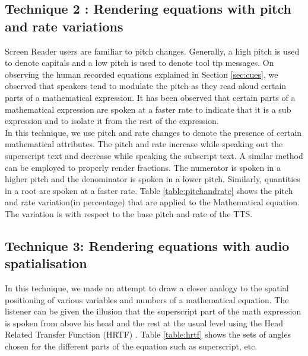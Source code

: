 \documentclass{article}
\begin{document}


\subsection{Technique 2 : Rendering equations with pitch and rate variations}
\label{ssec:t3}

Screen Reader users are familiar to pitch changes. Generally, a high pitch is used to denote capitals and a low pitch is used to denote tool tip messages. On observing the human recorded equations explained in Section \ref{sec:cues}, we observed that speakers tend to modulate the pitch as they read aloud certain parts of a mathematical expression. It has been observed that certain parts of a mathematical expression are spoken at a faster rate to indicate that it is a sub expression and to isolate it from the rest of the expression. \\

In this technique, we use pitch and rate changes to denote the presence of certain mathematical attributes. The pitch and rate increase while speaking out the superscript text and decrease while speaking the subscript text. A similar method can be employed to properly render fractions. The numerator is spoken in a higher pitch and the denominator is spoken in a lower pitch. Similarly, quantities in a root are spoken at a faster rate. Table \ref{table:pitchandrate} shows the pitch and rate variation(in percentage) that are applied to the Mathematical equation. The variation is with respect to the base pitch and rate of the TTS.


\subsection{Technique 3: Rendering equations with audio spatialisation}
\label{ssec:t4}
In this technique, we made an attempt to draw a closer analogy to the spatial positioning of various variables and numbers of a mathematical equation. The listener can be given the illusion that the superscript part of the math expression is spoken from above his head and the rest at the usual level using the Head Related Transfer Function (HRTF) \cite{geronazzo2011head}.
Table 
\ref{table:hrtf} shows the sets of angles chosen for the different parts of the equation such as superscript, etc. 
\end{document}
